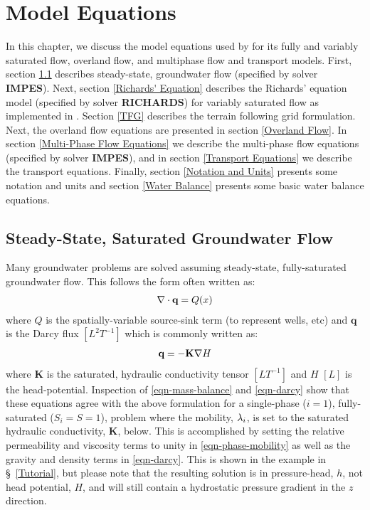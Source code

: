 
\chapter{Model Equations}
\label{Model_Equations}

In this chapter, we discuss the model equations used by \parflow{} for its
fully and variably saturated flow, overland flow, and multiphase flow and transport models.
First, section \ref{Steady-State, Saturated Groundwater Flow} describes steady-state, groundwater flow (specified by solver {\bf IMPES}). Next, section \ref{Richards' Equation} 
describes the Richards' equation model (specified by solver {\bf RICHARDS}) for variably saturated flow as 
implemented in \parflow{}. Section \ref{TFG} describes the terrain following grid formulation. Next, the overland flow 
equations are presented in section \ref{Overland Flow}. 
In section \ref{Multi-Phase Flow Equations} we describe the multi-phase
flow equations (specified by solver {\bf IMPES}), and in section \ref{Transport Equations} we describe
the transport equations. Finally, section \ref{Notation and Units} presents some notation and units and section \ref{Water Balance}
presents some basic water balance equations.
\section{Steady-State, Saturated Groundwater Flow}
\label{Steady-State, Saturated Groundwater Flow}
Many groundwater problems are solved assuming steady-state, fully-saturated groundwater flow.  This follows the form often written as:
\begin{eqnarray}
\nabla \cdot \textbf{q} = Q(x)
\label{eq:ssgw}
\end{eqnarray}
where $Q$ is the spatially-variable source-sink term (to represent wells, etc) and $\textbf{q}$ is the Darcy flux $[L^{2}T^{-1}]$ which is commonly written as:
\begin{eqnarray}
\textbf{q}=- \textbf{K} \nabla H
\label{eq:Darcy}
\end{eqnarray}
where $\textbf{K}$ is the saturated, hydraulic conductivity tensor $[LT^{-1}]$ and $H$ $[L]$ is the head-potential.  Inspection of \ref{eqn-mass-balance} and \ref{eqn-darcy} show that these equations agree with the above formulation for a single-phase ($i=1$), fully-saturated ($S_i=S=1$), problem where the mobility, ${\lambda}_i$, is set to the saturated hydraulic conductivity, $\textbf{K}$, below.  This is accomplished by setting the relative permeability and viscosity terms to unity in \ref{eqn-phase-mobility} as well as the gravity and density terms in \ref{eqn-darcy}.  This is shown in the example in \S~\ref{Tutorial}, but please note that the resulting solution is in pressure-head, $h$, not head potential, $H$, and will still contain a hydrostatic pressure gradient in the $z$ direction.

